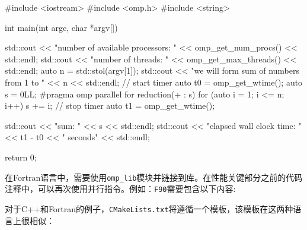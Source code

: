 \begin{codebox}[cpp]
#include <iostream>
#include <omp.h>
#include <string>

int main(int argc, char *argv[])
{
  std::cout << "number of available processors: " << omp_get_num_procs()
            << std::endl;
  std::cout << "number of threads: " << omp_get_max_threads() << std::endl;
  auto n = std::stol(argv[1]);
  std::cout << "we will form sum of numbers from 1 to " << n << std::endl;
  // start timer
  auto t0 = omp_get_wtime();
  auto s = 0LL;
#pragma omp parallel for reduction(+ : s)
  for (auto i = 1; i <= n; i++)
  {
    s += i;
  }
  // stop timer
  auto t1 = omp_get_wtime();

  std::cout << "sum: " << s << std::endl;
  std::cout << "elapsed wall clock time: " << t1 - t0 << " seconds" << std::endl;
  
  return 0;
}
\end{codebox}

在Fortran语言中，需要使用\texttt{omp\_lib}模块并链接到库。在性能关键部分之前的代码注释中，可以再次使用并行指令。例如：\texttt{F90}需要包含以下内容:



对于C++和Fortran的例子，\texttt{CMakeLists.txt}将遵循一个模板，该模板在这两种语言上很相似：

